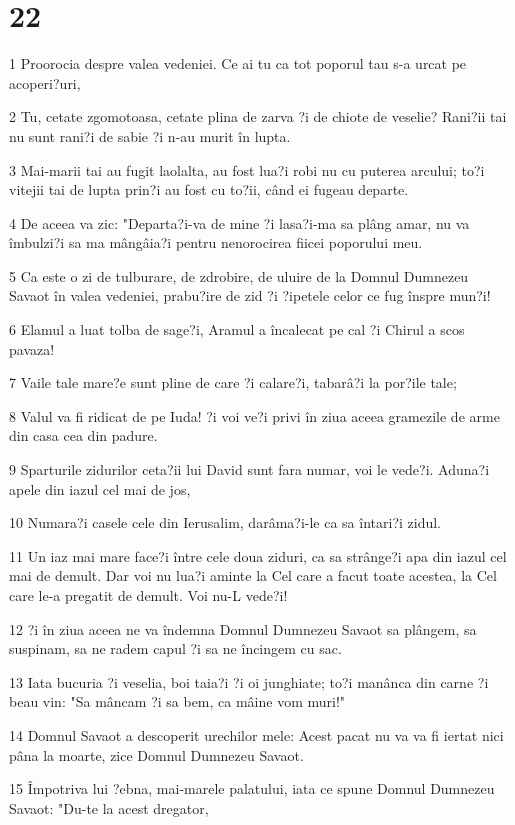\chapter{22}

\par 1 Proorocia despre valea vedeniei. Ce ai tu ca tot poporul tau s-a urcat pe acoperi?uri,
\par 2 Tu, cetate zgomotoasa, cetate plina de zarva ?i de chiote de veselie? Rani?ii tai nu sunt rani?i de sabie ?i n-au murit în lupta.
\par 3 Mai-marii tai au fugit laolalta, au fost lua?i robi nu cu puterea arcului; to?i vitejii tai de lupta prin?i au fost cu to?ii, când ei fugeau departe.
\par 4 De aceea va zic: "Departa?i-va de mine ?i lasa?i-ma sa plâng amar, nu va îmbulzi?i sa ma mângâia?i pentru nenorocirea fiicei poporului meu.
\par 5 Ca este o zi de tulburare, de zdrobire, de uluire de la Domnul Dumnezeu Savaot în valea vedeniei, prabu?ire de zid ?i ?ipetele celor ce fug înspre mun?i!
\par 6 Elamul a luat tolba de sage?i, Aramul a încalecat pe cal ?i Chirul a scos pavaza!
\par 7 Vaile tale mare?e sunt pline de care ?i calare?i, tabarâ?i la por?ile tale;
\par 8 Valul va fi ridicat de pe Iuda! ?i voi ve?i privi în ziua aceea gramezile de arme din casa cea din padure.
\par 9 Sparturile zidurilor ceta?ii lui David sunt fara numar, voi le vede?i. Aduna?i apele din iazul cel mai de jos,
\par 10 Numara?i casele cele din Ierusalim, darâma?i-le ca sa întari?i zidul.
\par 11 Un iaz mai mare face?i între cele doua ziduri, ca sa strânge?i apa din iazul cel mai de demult. Dar voi nu lua?i aminte la Cel care a facut toate acestea, la Cel care le-a pregatit de demult. Voi nu-L vede?i!
\par 12 ?i în ziua aceea ne va îndemna Domnul Dumnezeu Savaot sa plângem, sa suspinam, sa ne radem capul ?i sa ne încingem cu sac.
\par 13 Iata bucuria ?i veselia, boi taia?i ?i oi junghiate; to?i manânca din carne ?i beau vin: "Sa mâncam ?i sa bem, ca mâine vom muri!"
\par 14 Domnul Savaot a descoperit urechilor mele: Acest pacat nu va va fi iertat nici pâna la moarte, zice Domnul Dumnezeu Savaot.
\par 15 Împotriva lui ?ebna, mai-marele palatului, iata ce spune Domnul Dumnezeu Savaot: "Du-te la acest dregator,
